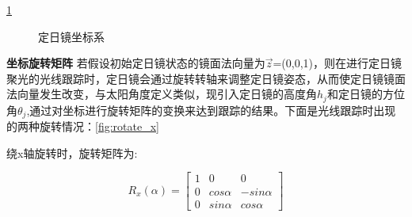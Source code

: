 \documentclass[withoutpreface,bwprint]{cumcmthesis} %
\begin{document}
\ref{fig:coordinate_of_mirror}

\begin{figure}[hptb]
    \centering
    \caption{定日镜坐标系}
    \label{fig:coordinate_of_mirror}
\end{figure}

\textbf{坐标旋转矩阵} \space 若假设初始定日镜状态的镜面法向量为$\vec{z}$=(0,0,1)，则在进行定日镜聚光的光线跟踪时，定日镜会通过旋转转轴来调整定日镜姿态，从而使定日镜镜面法向量发生改变，与太阳角度定义类似，现引入定日镜的高度角$h_{j}$和定日镜的方位角$\theta_{j}$,通过对坐标进行旋转矩阵的变换来达到跟踪的结果。下面是光线跟踪时出现的两种旋转情况：\ref{fig:rotate_x}

绕x轴旋转时，旋转矩阵为:

\begin{equation}
    R_{x}(\alpha)=\left[\begin{array}{ccc}
            1 & 0         & 0          \\
            0 & cos\alpha & -sin\alpha \\
            0 & sin\alpha & cos\alpha
        \end{array}\right] \label{eq:rotate_x}
\end{equation}
\end{document}
